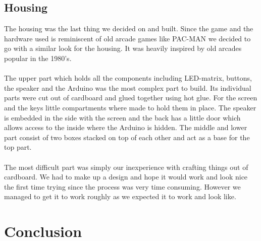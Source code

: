 \documentclass[12pt, a4paper]{article}
\begin{document}
\subsection*{Housing}

The housing was the last thing we decided on and built. Since the game and the hardware used is reminiscent of old arcade games like PAC-MAN we decided to go with a similar look for the housing. It was heavily inspired by old arcades popular in the 1980's.\\\\
The upper part which holds all the components including LED-matrix, buttons, the speaker and the Arduino was the most complex part to build. Its individual parts were cut out of cardboard and glued together using hot glue. For the screen and the keys little compartments where made to hold them in place. The speaker is embedded in the side with the screen and the back has a little door which allows access to the inside where the Arduino is hidden. The middle and lower part consist of two boxes stacked on top of each other and act as a base for the top part.\\\\
The most difficult part was simply our inexperience with crafting things out of cardboard. We had to make up a design and hope it would work and look nice the first time trying since the process was very time consuming. However we managed to get it to work roughly as we expected it to work and look like.

\section*{Conclusion}

\printbibliography
\end{document}
